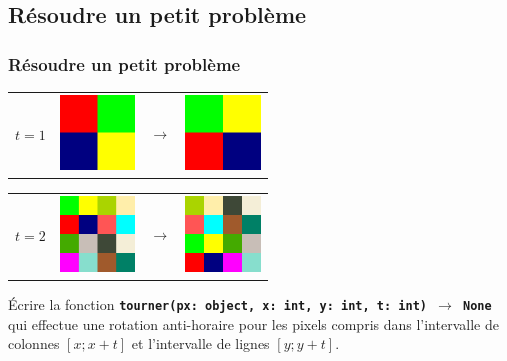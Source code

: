 \documentclass[svgnames,11pt]{beamer}
\begin{document}
\subsection{Résoudre un petit problème}
\begin{frame}
    \frametitle{Résoudre un petit problème}
    \begin{center}
        \begin{tabular}{cccc}
            {\Large $t=1$}
            &
            \includegraphics[width=2cm]{ressources/carre1.png}
             & $$\rightarrow$$
             &
            \includegraphics[width=2cm]{ressources/carre1-rot.png}
            \\
        \end{tabular}
    \end{center}
    \begin{center}
        \begin{tabular}{cccc}
            {\Large $t=2$}
            &
            \includegraphics[width=2cm]{ressources/carre2-int.png}
            & $$\rightarrow$$
             &
            \includegraphics[width=2cm]{ressources/carre2-rot.png}
            \\
        \end{tabular}
    \end{center}
    \begin{activite}
    Écrire la fonction \textbf{\texttt{tourner(px: object, x: int, y: int, t: int) $\rightarrow$ None}} qui effectue une rotation anti-horaire pour les pixels compris dans l'intervalle de colonnes $[x; x+t]$ et l'intervalle de lignes $[y; y+t]$.
    \end{activite}

\end{frame}
\end{document}

